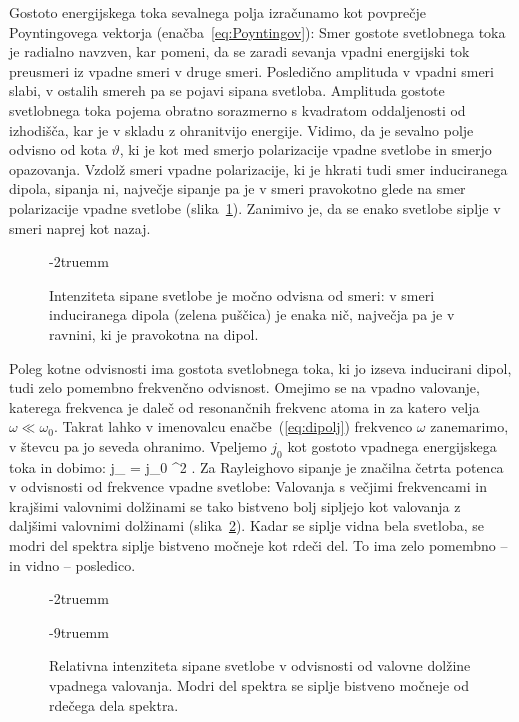 Gostoto energijskega toka sevalnega polja izračunamo kot povprečje 
Poyntingovega vektorja (enačba~\ref{eq:Poyntingov}):
Smer gostote svetlobnega toka je radialno navzven, 
kar pomeni, da se zaradi sevanja vpadni energijski tok preusmeri iz vpadne smeri
v druge smeri. Posledično amplituda v vpadni smeri slabi, v ostalih smereh pa se 
pojavi sipana svetloba. Amplituda gostote svetlobnega toka 
pojema obratno sorazmerno s kvadratom oddaljenosti od izhodišča, kar je v skladu
z ohranitvijo energije.  
Vidimo, da je sevalno polje odvisno od kota $\vartheta$,
ki je kot med smerjo polarizacije vpadne svetlobe in smerjo opazovanja. Vzdolž
smeri vpadne polarizacije, ki je hkrati tudi smer induciranega dipola, sipanja ni, 
največje sipanje pa je v smeri pravokotno glede na smer polarizacije vpadne svetlobe (slika~\ref{fig:07_dipol}). Zanimivo je, da se enako svetlobe siplje v smeri naprej kot nazaj.
\begin{figure}[!h]
\vglue-2truemm
\centering
\def\svgwidth{60truemm} 

\caption{Intenziteta sipane svetlobe je močno odvisna od smeri: v smeri induciranega
dipola (zelena puščica) je enaka nič, največja pa je v ravnini, ki je pravokotna na dipol.}
\label{fig:07_dipol}
\end{figure}

Poleg kotne odvisnosti ima gostota svetlobnega toka, ki jo izseva inducirani dipol, 
tudi zelo pomembno frekvenčno odvisnost. Omejimo se na vpadno valovanje, katerega 
frekvenca je daleč od resonančnih frekvenc atoma in za katero velja 
$\omega \ll \omega_0$. Takrat lahko v imenovalcu enačbe~(\ref{eq:dipolj}) 
frekvenco $\omega$ zanemarimo, v števcu
pa jo seveda ohranimo. Vpeljemo $j_0$ kot gostoto vpadnega energijskega toka in dobimo:
\beq
j_
= j_0   
\sin^2 \vartheta.
\label{eq:07_53}
\eeq
Za Rayleighovo sipanje je značilna četrta potenca v odvisnosti od frekvence 
vpadne svetlobe:
Valovanja s večjimi frekvencami in krajšimi valovnimi dolžinami se tako 
bistveno bolj sipljejo kot valovanja z daljšimi valovnimi dolžinami 
(slika~\ref{fig:07_rayleighlambda}). Kadar se
siplje vidna bela svetloba, se modri del spektra siplje bistveno močneje kot rdeči
del. To ima zelo pomembno -- in vidno -- posledico.
\begin{figure}[!h]
\vglue-2truemm
\centering
\def\svgwidth{60truemm} 

\caption{Relativna intenziteta sipane svetlobe v odvisnosti od valovne dolžine vpadnega
valovanja. Modri del spektra se siplje bistveno močneje od rdečega dela spektra.}
\label{fig:07_rayleighlambda}
\vglue-9truemm
\end{figure}

